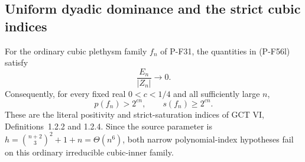 \subsection{Uniform dyadic dominance and the strict cubic indices}

\begin{theorem}
\label{thm:dyadicdominance}
For the ordinary cubic plethysm family $f_n$ of P-F31, the
quantities in (P-F56l) satisfy
\[
                         \frac{E_n}{|Z_n|}\longrightarrow0.
 \tag{P-F57a}
\]
Consequently, for every fixed real $0<c<1/4$ and all
sufficiently large $n$,
\[
                  p(f_n)>2^{cn},
             \qquad s(f_n)\ge2^{cn}.
\]
These are the literal positivity and strict-saturation indices
of GCT VI, Definitions~1.2.2 and 1.2.4.
Since the source parameter is
$h=\binom{n+2}{3}^{\!2}+1+n=\Theta(n^6)$, both narrow
polynomial-index hypotheses fail on this ordinary irreducible
cubic-inner family.
\end{theorem}

